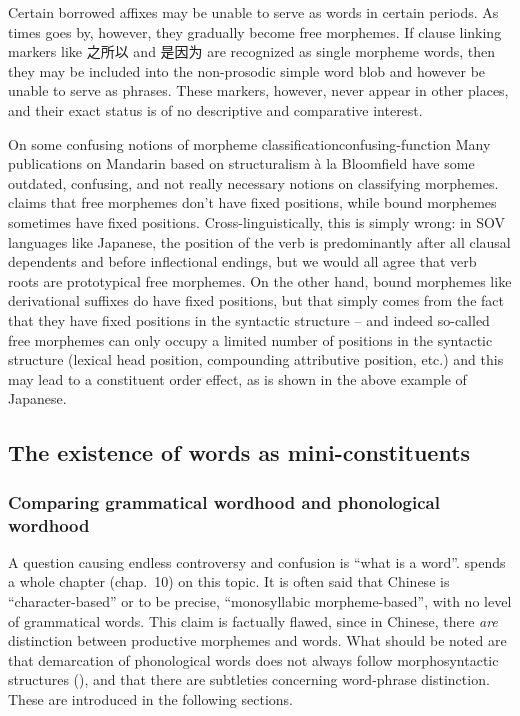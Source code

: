\documentclass[UTF8, a4paper, oneside, scheme=plain, 12pt]{ctexrep}
\newcommand*{\citechap}[1]{chap.~{#1}}
\newcommand*{\citepage}[1]{p.~{#1}}
\newcommand*{\term}[1]{\emph{#1}}
\newcommand{\ala}{à la}
\begin{document}
Certain borrowed affixes may be unable to serve as words in certain periods.
As times goes by, however, they gradually become free morphemes.
If clause linking markers like 之所以 and 是因为 are recognized as single morpheme words,
then they may be included into the non-prosodic simple word blob 
and however be unable to serve as phrases.
These markers, however, never appear in other places,
and their exact status is of no descriptive and comparative interest.

\begin{infobox}{On some confusing notions of morpheme classification}{confusing-function}
    Many publications on Mandarin based on structuralism \ala{} Bloomfield 
    have some outdated, confusing, and not really necessary 
    notions on classifying morphemes.
    \citet[\citepage{16}]{zhudexigrammar} claims that 
    free morphemes don't have fixed positions, 
    while bound morphemes sometimes have fixed positions.
    Cross-linguistically, this is simply wrong: 
    in SOV languages like Japanese, 
    the position of the verb is predominantly 
    after all clausal dependents and before inflectional endings, 
    but we would all agree that verb roots are prototypical free morphemes.
    On the other hand, 
    bound morphemes like derivational suffixes 
    do have fixed positions, 
    but that simply comes from the fact that 
    they have fixed positions in the syntactic structure -- 
    and indeed so-called free morphemes can only occupy a limited number 
    of positions in the syntactic structure 
    (lexical head position, compounding attributive position, etc.)
    and this may lead to a constituent order effect, 
    as is shown in the above example of Japanese.
\end{infobox}

\subsection{The existence of words as mini-constituents}\label{sec:pos.word}

\subsubsection{Comparing grammatical wordhood and phonological wordhood}\label{sec:pos.word.phonological}

A question causing endless controversy and confusion 
is ``what is a word''. 
\citet{dixon2010basic2} spends a whole chapter (\citechap{10}) on this topic.
It is often said that Chinese is ``character-based''
or to be precise, ``monosyllabic morpheme-based'',
with no level of grammatical words.
This claim is factually flawed, 
since in Chinese, there \term{are} distinction between 
productive morphemes and words.
What should be noted are
that demarcation of phonological words does not always follow morphosyntactic structures
(),
and that there are subtleties concerning word-phrase distinction. 
These are introduced in the following sections.
\end{document}
